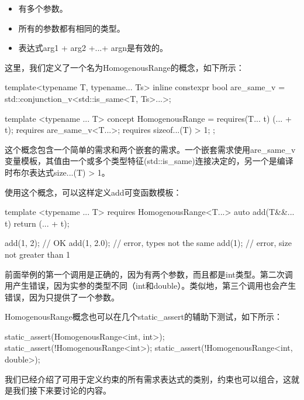 \begin{itemize}
  \item 有多个参数。
  \item 所有的参数都有相同的类型。
  \item 表达式arg1 + arg2 +...+ argn是有效的。
\end{itemize}

这里，我们定义了一个名为HomogenousRange的概念，如下所示：

\begin{cppcode}
template<typename T, typename... Ts>
inline constexpr bool are_same_v =
	std::conjunction_v<std::is_same<T, Ts>...>;
	
template <typename ... T>
concept HomogenousRange = requires(T... t)
{
	(... + t);
	requires are_same_v<T...>;
	requires sizeof...(T) > 1;
};
\end{cppcode}

这个概念包含一个简单的需求和两个嵌套的需求。一个嵌套需求使用are_same_v变量模板，其值由一个或多个类型特征(std::is_same)连接决定的，另一个是编译时布尔表达式size...(T) > 1。

使用这个概念，可以这样定义add可变函数模板：

\begin{cppcode}
template <typename ... T>
requires HomogenousRange<T...>
auto add(T&&... t)
{
	return (... + t);
}

add(1, 2); // OK
add(1, 2.0); // error, types not the same
add(1); // error, size not greater than 1
\end{cppcode}

前面举例的第一个调用是正确的，因为有两个参数，而且都是int类型。第二次调用产生错误，因为实参的类型不同（int和double）。类似地，第三个调用也会产生错误，因为只提供了一个参数。

HomogenousRange概念也可以在几个static_assert的辅助下测试，如下所示：

\begin{cppcode}
static_assert(HomogenousRange<int, int>);
static_assert(!HomogenousRange<int>);
static_assert(!HomogenousRange<int, double>);
\end{cppcode}

我们已经介绍了可用于定义约束的所有需求表达式的类别，约束也可以组合，这就是我们接下来要讨论的内容。

















